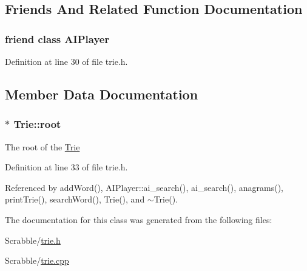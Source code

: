 \subsection{Friends And Related Function Documentation}
\hypertarget{class_trie_a2c11a076a909acd936d897cd2a81f931}{
\subsubsection[{A\-I\-Player}]{\setlength{\rightskip}{0pt plus 5cm}friend class {\bf A\-I\-Player}\hspace{0.3cm}{\ttfamily [friend]}}}\label{class_trie_a2c11a076a909acd936d897cd2a81f931}


Definition at line 30 of file trie.\-h.



\subsection{Member Data Documentation}
\hypertarget{class_trie_a052cecab75ca88758778d340ed002d66}{
\subsubsection[{root}]{$\ast$ Trie\-::root\hspace{0.3cm}{\ttfamily [private]}}}\label{class_trie_a052cecab75ca88758778d340ed002d66}
The root of the \hyperlink{class_trie}{Trie} 

Definition at line 33 of file trie.\-h.



Referenced by add\-Word(), A\-I\-Player\-::ai\-\_\-search(), ai\-\_\-search(), anagrams(), print\-Trie(), search\-Word(), Trie(), and $\sim$\-Trie().



The documentation for this class was generated from the following files\-:\begin{DoxyCompactItemize}
\item 
Scrabble/\hyperlink{trie_8h}{trie.\-h}\item 
Scrabble/\hyperlink{trie_8cpp}{trie.\-cpp}\end{DoxyCompactItemize}
